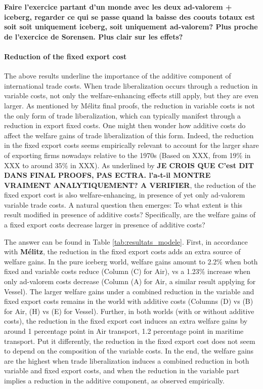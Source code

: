 \documentclass[a4paper,11pt]{article}
\begin{document}
\textbf{Faire l'exercice partant d'un monde avec les deux ad-valorem + iceberg, regarder ce qui se passe quand la baisse des coouts totaux est soit soit uniquement iceberg, soit uniquement ad-valorem? Plus proche de l'exercice de Sorensen. Plus clair sur les effets? }


\paragraph{Reduction of the fixed export cost} The above results underline the importance of the additive component of international trade costs. When trade liberalization occurs through a reduction in variable costs, not only the welfare-enhancing effects still apply, but they are even larger. As mentioned by Mélitz final proofs, the reduction in variable costs is not the only form of trade liberalization, which can typically manifest through a reduction in export fixed costs. One might then wonder how additive costs do affect the welfare gains of trade liberalization of this form. Indeed, the reduction in the fixed export costs seems empirically relevant to account for the larger share of exporting firms nowadays relative to the 1970s (Based on XXX, from 19\% in XXX to around 35\% in XXX). As underlined by \cite{melitz} \textbf{JE CROIS QUE C'est DIT DANS FINAL PROOFS, PAS ECTRA. l'a-t-il MONTRE VRAIMENT ANALYTIQUEMENT? A VERIFIER}, the reduction of the fixed export cost is also welfare-enhancing, in presence of yet only ad-valorem variable trade costs. A natural question then emerges: To what extent is this result modified in presence of additive costs? Specifically, are the welfare gains of a fixed export costs decrease larger in presence of additive costs?

The answer can be found in Table \ref{tab:resultats_modele}. First, in accordance with \textbf{Mélitz}, the reduction in the fixed export costs adds an extra source of welfare gains. In the pure iceberg world, welfare gains amount to 2.2\% when both fixed and variable costs reduce (Column (C) for Air), vs a 1.23\% increase when only ad-valorem costs decrease (Column (A) for Air, a similar result applying for Vessel). The larger welfare gains under a combined reduction in the variable and fixed export costs remains in the world with additive costs (Columns (D) vs (B) for Air, (H) vs (E) for Vessel). Further, in both worlds (with or without additive costs), the reduction in the fixed export cost induces an extra welfare gains by around 1 percentage point in Air transport, 1.2 percentage point in maritime transport. Put it differently, the reduction in the fixed export cost does not seem to depend on the composition of the variable costs. In the end, the welfare gains are the highest when trade liberalization induces a combined reduction in both variable and fixed export costs, and when the reduction in the variable part implies a reduction in the additive component, as observed empirically.
\end{document}
